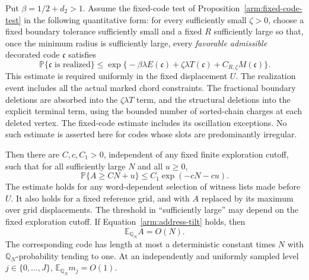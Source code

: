 \begin{proposition}\label{arm:occupancy-tail}
Put $\beta=1/2+d_2>1$.  Assume the fixed-code test of
Proposition~\ref{arm:fixed-code-test} in the following quantitative form:
for every sufficiently small $\zeta>0$, choose a fixed boundary
tolerance sufficiently small and a fixed $R$ sufficiently large so
that, once the minimum radius is sufficiently large, every
\emph{favorable admissible} decorated code $\mathfrak c$ satisfies
\begin{equation}\label{arm:required-fixed-code-bound}
 \mathbb P\{\mathfrak c\text{ is realized}\}
 \leq\exp\bigl\{-\beta\lambda E(\mathfrak c)
          +\zeta\lambda T(\mathfrak c)
          +C_{R,\zeta}M(\mathfrak c)\bigr\}.
\end{equation}
This estimate is required uniformly in the fixed displacement $U$.
The realization event includes all the actual marked chord constraints.
The fractional boundary deletions are absorbed into the $\zeta\lambda T$
term, and the structural deletions into the explicit terminal term,
using the bounded number of sorted-chain charges at each deleted
vertex.  The fixed-code estimate includes its oscillation exceptions.
No such estimate is asserted here for codes whose slots are
predominantly irregular.

Then there are $C,c,C_1>0$, independent of any fixed finite exploration
cutoff, such that for all sufficiently large $N$ and all $u\geq0$,
\begin{equation}\label{arm:occupancy-exponential-tail}
 \mathbb P\{A\geq CN+u\}
 \leq C_1\exp(-cN-cu).
\end{equation}
The estimate holds for any word-dependent selection of witness lists
made before $U$.  It also holds for a fixed reference grid, and with
$A$ replaced by its maximum over grid displacements.  The threshold
in ``sufficiently large'' may depend on the fixed exploration cutoff.
If Equation~\eqref{arm:address-tilt} holds, then
\begin{equation}\label{arm:occupancy-tilted-mean}
 \mathbb E_{\mathbb Q_N}A=O(N).
\end{equation}
The corresponding code has length at most a deterministic constant
times $N$ with $\mathbb Q_N$-probability tending to one.  At an
independently and uniformly sampled level $j\in\{0,\ldots,J\}$,
$\mathbb E_{\mathbb Q_N}m_j=O(1)$.
\end{proposition}
